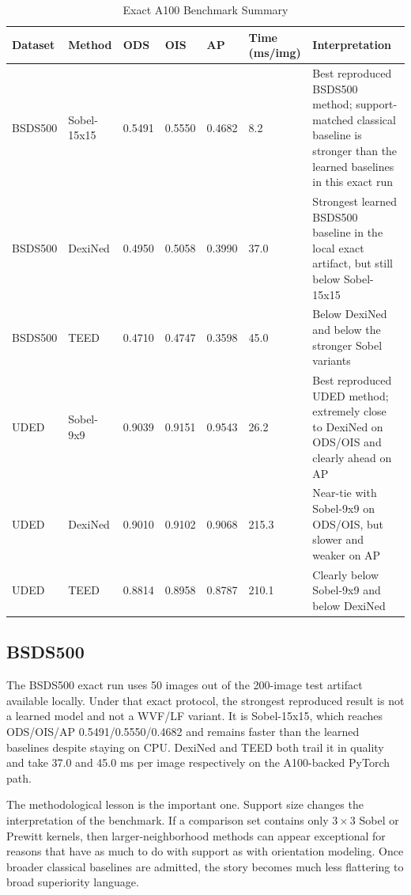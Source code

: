\documentclass[conference]{IEEEtran}
\begin{document}
\begin{table}[t]
\centering
\caption{Exact A100 Benchmark Summary}
\label{tab:exact}
\scriptsize
\begin{tabular}{P{1.6cm}P{2.5cm}P{1.3cm}P{1.3cm}P{1.3cm}P{1.5cm}P{4.7cm}}
\toprule
Dataset & Method & ODS & OIS & AP & Time (ms/img) & Interpretation \\
\midrule
BSDS500 & Sobel-15x15 & 0.5491 & 0.5550 & 0.4682 & 8.2 & Best reproduced BSDS500 method; support-matched classical baseline is stronger than the learned baselines in this exact run \\
BSDS500 & DexiNed & 0.4950 & 0.5058 & 0.3990 & 37.0 & Strongest learned BSDS500 baseline in the local exact artifact, but still below Sobel-15x15 \\
BSDS500 & TEED & 0.4710 & 0.4747 & 0.3598 & 45.0 & Below DexiNed and below the stronger Sobel variants \\
UDED & Sobel-9x9 & 0.9039 & 0.9151 & 0.9543 & 26.2 & Best reproduced UDED method; extremely close to DexiNed on ODS/OIS and clearly ahead on AP \\
UDED & DexiNed & 0.9010 & 0.9102 & 0.9068 & 215.3 & Near-tie with Sobel-9x9 on ODS/OIS, but slower and weaker on AP \\
UDED & TEED & 0.8814 & 0.8958 & 0.8787 & 210.1 & Clearly below Sobel-9x9 and below DexiNed \\
\bottomrule
\end{tabular}
\end{table}

\subsection{BSDS500}
The BSDS500 exact run uses 50 images out of the 200-image test artifact available locally. Under that exact protocol, the strongest reproduced result is not a learned model and not a WVF/LF variant. It is Sobel-15x15, which reaches ODS/OIS/AP 0.5491/0.5550/0.4682 and remains faster than the learned baselines despite staying on CPU. DexiNed and TEED both trail it in quality and take 37.0 and 45.0 ms per image respectively on the A100-backed PyTorch path.

The methodological lesson is the important one. Support size changes the interpretation of the benchmark. If a comparison set contains only $3\times3$ Sobel or Prewitt kernels, then larger-neighborhood methods can appear exceptional for reasons that have as much to do with support as with orientation modeling. Once broader classical baselines are admitted, the story becomes much less flattering to broad superiority language.
\end{document}
